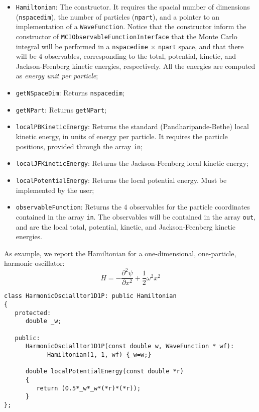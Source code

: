 \documentclass[11pt,a4paper,twoside]{article}
\begin{document}
\begin{itemize}
   \item \verb+Hamiltonian+: The constructor. It requires the spacial number of dimensions (\verb+nspacedim+), the number of particles (\verb+npart+), and a pointer to an implementation of a \verb+WaveFunction+. Notice that the constructor inform the constructor of \verb+MCIObservableFunctionInterface+ that the Monte Carlo integral will be performed in a \verb+nspacedime+ $\times$ \verb+npart+ space, and that there will be $4$ observables, corresponding to the total, potential, kinetic, and Jackson-Feenberg kinetic energies, respectively. All the energies are computed as \emph{energy unit per particle};
   \item \verb+getNSpaceDim+: Returns \verb+nspacedim+;
   \item \verb+getNPart+: Returns \verb+getNPart+;
   \item \verb+localPBKineticEnergy+: Returns the standard (Pandharipande-Bethe) local kinetic energy, in units of energy per particle. It requires the particle positions, provided through the array \verb+in+;
   \item \verb+localJFKineticEnergy+: Returns the Jackson-Feenberg local kinetic energy;
   \item \verb+localPotentialEnergy+: Returns the local potential energy. Must be implemented by the user;
   \item \verb+observableFunction+: Returns the $4$ observables for the particle coordinates contained in the array \verb+in+. The observables will be contained in the array \verb+out+, and are the local total, potential, kinetic, and Jackson-Feenberg kinetic energies.
\end{itemize}

As example, we report the Hamiltonian for a one-dimensional, one-particle, harmonic oscillator:
\begin{equation}
   H = - \frac{\partial^2 \psi}{\partial x^2} + \frac{1}{2} \omega^2 x^2
\end{equation}

\begin{lstlisting}
class HarmonicOscialltor1D1P: public Hamiltonian
{
   protected:
      double _w;

   public:
      HarmonicOscialltor1D1P(const double w, WaveFunction * wf):
            Hamiltonian(1, 1, wf) {_w=w;}

      double localPotentialEnergy(const double *r)
      {
         return (0.5*_w*_w*(*r)*(*r));
      }
};
\end{lstlisting}
\end{document}
